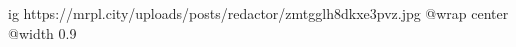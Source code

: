  
 
 
 
 

\ifcmt
  ig https://mrpl.city/uploads/posts/redactor/zmtgglh8dkxe3pvz.jpg
  @wrap center
  @width 0.9
\fi
